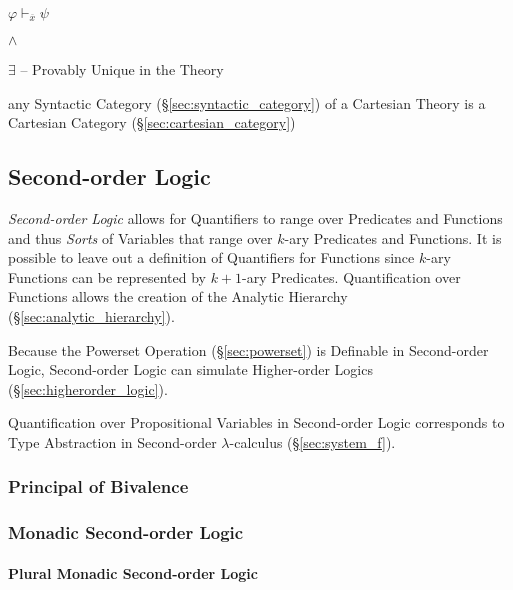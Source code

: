 $\varphi \vdash_{\overline{x}} \psi$

$\wedge$

$\exists$ -- Provably Unique in the Theory

any Syntactic Category (\S\ref{sec:syntactic_category}) of a Cartesian
Theory is a Cartesian Category (\S\ref{sec:cartesian_category})



\subsection{Second-order Logic}\label{sec:secondorder_logic}

\emph{Second-order Logic} allows for Quantifiers to range over
Predicates and Functions and thus \emph{Sorts} of Variables that range
over $k$-ary Predicates and Functions. It is possible to leave out a
definition of Quantifiers for Functions since $k$-ary Functions can be
represented by $k+1$-ary Predicates.\cite{shapiro00} Quantification
over Functions allows the creation of the Analytic Hierarchy
(\S\ref{sec:analytic_hierarchy}).

Because the Powerset Operation (\S\ref{sec:powerset}) is Definable in
Second-order Logic, Second-order Logic can simulate Higher-order
Logics (\S\ref{sec:higherorder_logic}).

Quantification over Propositional Variables in Second-order Logic
corresponds to Type Abstraction in Second-order $\lambda$-calculus
(\S\ref{sec:system_f}).



\subsubsection{Principal of Bivalence}\label{sec:bivalence_principal}

\subsubsection{Monadic Second-order Logic}\label{sec:monadic_secondorder}

\paragraph{Plural Monadic Second-order Logic}\hfill
\label{sec:plural_monadic_secondorder}\hfill \\

